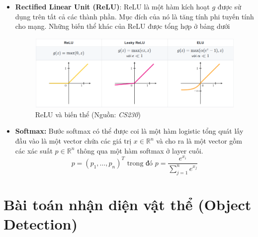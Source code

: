 \documentclass[a4paper, 12pt]{report}
\begin{document}
\begin{itemize}
	\item \textbf{Rectified Linear Unit (ReLU)}: ReLU là một hàm kích hoạt $g$ được sử dụng trên tất cả các thành phần. Mục đích của nó là tăng tính phi tuyến tính cho mạng. Những biến thể khác của ReLU được tổng hợp ở bảng dưới\par
	\begin{figure}[h!]
		\centering
		\includegraphics[width=1\linewidth]{Images/relu1}
		\caption{ReLU và biến thể (Nguồn: \textit{CS230})}
		\label{fig:relu1}
	\end{figure}
	\item \textbf{Softmax:} Bước softmax có thể được coi là một hàm logistic tổng quát lấy đầu vào là một vector chứa các giá trị $x \in \mathbb{R}^n$ và cho ra là một vector gồm các xác suất $p \in \mathbb{R}^n$ thông qua một hàm softmax ở layer cuối.
	$$ p = (p_1,\dots,p_n)^T \text{ trong đó } p = \frac{e^{x_i}}{\displaystyle\sum_{j=1}^ne^{x_j}} $$
\end{itemize}

\section{Bài toán nhận diện vật thể (Object Detection)}
\end{document}
